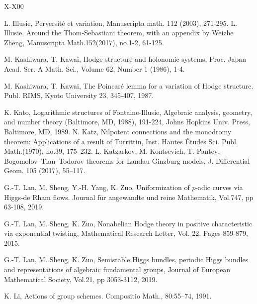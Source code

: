 \documentclass[12pt, a4paper]{article}
\begin{document}
\begin{thebibliography}{X-X00}
 	
 	L. Illusie, Perversit\'e et variation, Manuscripta math. 112 (2003), 271-295.
	L. Illusie, Around the Thom-Sebastiani theorem, with an appendix by Weizhe Zheng, 
Manuscripta Math.152(2017), no.1-2, 61-125.	

 	M. Kashiwara, T. Kawai, Hodge structure and holonomic systems, Proc. Japan Acad. Ser. A Math. Sci., Volume 62, Number 1 (1986), 1-4.
 	
 	M. Kashiwara, T. Kawai, The Poincar\'e lemma for a variation of Hodge structure. Publ. RIMS, Kyoto University 23, 345-407, 1987.
 	
 	K. Kato, Logarithmic structures of Fontaine-Illusie, Algebraic
 	analysis, geometry, and number theory (Baltimore, MD, 1988),
 	191-224, Johns Hopkins Univ. Press, Baltimore, MD, 1989.
	N. Katz, Nilpotent connections and the monodromy theorem: Applications of a result of Turrittin, Inst. Hautes Études Sci. Publ. Math.(1970), no.39, 175–232.	
 L. Katzarkov, M. Kontsevich, T. Pantev, Bogomolov–Tian–Todorov theorems for Landau
Ginzburg models, J. Differential Geom. 105 (2017), 55–117.

    

 	G.-T. Lan, M. Sheng, Y.-H. Yang, K. Zuo, Uniformization of $p$-adic curves via Higgs-de Rham flows. Journal f\"{u}r angewandte und reine Mathematik, Vol.747, pp 63-108, 2019.
 	
 	G.-T. Lan, M. Sheng, K. Zuo, Nonabelian Hodge theory in positive characteristic via exponential twisting, Mathematical Research Letter, Vol. 22, Pages 859-879, 2015.
 	
 	G.-T. Lan, M. Sheng, K. Zuo, Semistable Higgs bundles,
 	periodic Higgs bundles and representations of algebraic fundamental
 	groups, Journal of European Mathematical Society, Vol.21, pp 3053-3112, 2019.

K. Li, Actions of group schemes. Compositio Math., 80:55–74, 1991.
     

\end{thebibliography}
\end{document}
